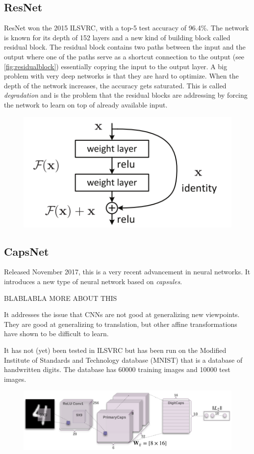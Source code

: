 \subsection{ResNet}\label{subsection:resnet}
ResNet won the 2015 ILSVRC, with a top-5 test accuracy of 96.4\%. The network is known for its depth of 152 layers and a new kind of building block called residual block. The residual block contains two paths between the input and the output where one of the paths serve as a shortcut connection to the output (see \autoref{fig:residualblock}) essentially copying the input to the output layer. A big problem with very deep networks is that they are hard to optimize. When the depth of the network increases, the accuracy gets saturated. This is called \emph{degradation} and is the problem that the residual blocks are addressing by forcing the network to learn on top of already available input. 

\begin{figure}[H]
	\centering
	\includegraphics[width=0.5\linewidth]{fig/residual.png}
	\label{fig:residualblock}
\end{figure}


\subsection{CapsNet}
Released November 2017, this is a very recent advancement in neural networks. It introduces a new type of neural network based on \emph{capsules}. 

BLABLABLA MORE ABOUT THIS

It addresses the issue that CNNs are not good at generalizing new viewpoints. They are good at generalizing to translation, but other affine transformations have shown to be difficult to learn. 


It has not (yet) been tested in ILSVRC but has been run on the Modified Institute of Standards and Technology database (MNIST) that is a database of handwritten digits. The database has 60000 training images and 10000 test images. 

\begin{figure}[H]
	\centering
	\includegraphics[width=0.7\linewidth]{fig/capsnet.png}
	\label{fig:capsnet}
\end{figure}


